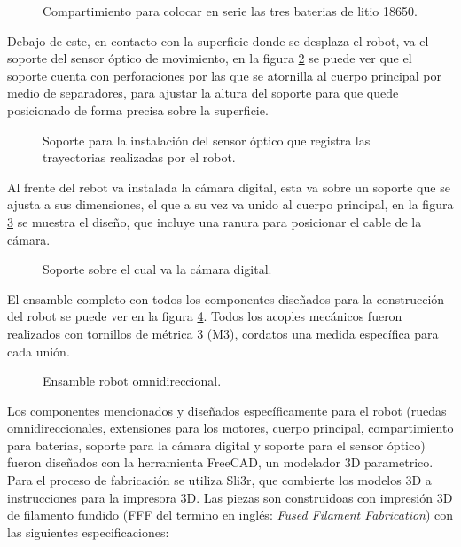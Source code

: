 \documentclass{iccmemoria}
\begin{document}
\begin{figure}[H]
  \centering
  
  \caption{Compartimiento para colocar en serie las tres baterias de litio 18650.}
  \label{fig:battery_compartment}
\end{figure}

Debajo de este, en contacto con la superficie donde se desplaza el robot, va el soporte del sensor óptico de movimiento, en la figura \ref{fig:mouse_holder} se puede ver que el soporte cuenta con perforaciones por las que se atornilla al cuerpo principal por medio de separadores, para ajustar la altura del soporte para que quede posicionado de forma precisa sobre la superficie.\\

\begin{figure}[H]
  \centering
  
  \caption{Soporte para la instalación del sensor óptico que registra las trayectorias realizadas por el robot.}
  \label{fig:mouse_holder}
\end{figure}

Al frente del rebot va instalada la cámara digital, esta va sobre un soporte que se ajusta a sus dimensiones, el que a su vez va unido al cuerpo principal, en la figura \ref{fig:camera_holder} se muestra el diseño, que incluye una ranura para posicionar el cable de la cámara.\\

\begin{figure}[H]
  \centering
  
  \caption{Soporte sobre el cual va la cámara digital.}
  \label{fig:camera_holder}
\end{figure}

El ensamble completo con todos los componentes diseñados para la construcción del robot se puede ver en la figura \ref{fig:robot_assembly}. Todos los acoples mecánicos fueron realizados con tornillos de métrica 3 (M3), cordatos una medida específica para cada unión.

\begin{figure}[H]
  \centering
  
  \caption{Ensamble robot omnidireccional.}
  \label{fig:robot_assembly}
\end{figure}

Los componentes mencionados y diseñados específicamente para el robot (ruedas omnidireccionales, extensiones para los motores, cuerpo principal, compartimiento para baterías, soporte para la cámara digital y soporte para el sensor óptico) fueron diseñados con la herramienta FreeCAD, un modelador 3D parametrico. Para el proceso de fabricación se utiliza Sli3r, que combierte los modelos 3D a instrucciones para la impresora 3D. Las piezas son construidoas con impresión 3D de filamento fundido (FFF del termino en inglés: \emph{Fused Filament Fabrication}) con las siguientes especificaciones:\\
\end{document}
